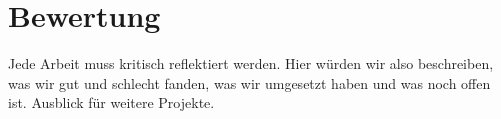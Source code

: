 \chapter{Bewertung}
Jede Arbeit muss kritisch reflektiert werden. Hier würden wir also beschreiben, was wir gut und schlecht fanden, was wir umgesetzt haben und was noch offen ist. Ausblick für weitere Projekte.

